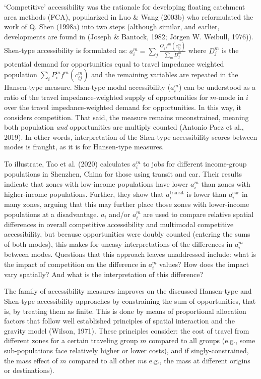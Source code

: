 \documentclass[
11pt, %
oneside, %
english, %
singlespacing, %
]{macthesis} %
\begin{document}
`Competitive' accessibility was the rationale for developing floating catchment area methods (FCA), popularized in Luo \& Wang (2003b) who reformulated the work of Q. Shen (1998a) into two steps (although similar, and earlier, developments are found in (Joseph \& Bantock, 1982; Jörgen W. Weibull, 1976)). Shen-type accessibility is formulated as: \(a_i^m = \sum_j \frac{O_jf^m(c_{ij}^m)}{\sum_m D_j^m}\) where \(D_j^m\) is the potential demand for opportunities equal to travel impedance weighted population \(\sum_i P_i^m f^m(c_{ij}^m)\) and the remaining variables are repeated in the Hansen-type measure. Shen-type modal accessibility (\(a_i^m\)) can be understood as a ratio of the travel impedance-weighted supply of opportunities for \(m\)-mode in \(i\) over the travel impedance-weighted demand for opportunities. In this way, it considers competition. That said, the measure remains unconstrained, meaning both population \emph{and} opportunities are multiply counted (Antonio Paez et al., 2019). In other words, interpretation of the Shen-type accessibility scores between modes is fraught, as it is for Hansen-type measures.

To illustrate, Tao et al. (2020) calculates \(a_i^m\) to jobs for different income-group populations in Shenzhen, China for those using transit and car. Their results indicate that zones with low-income populations have lower \(a_i^m\) than zones with higher-income populations. Further, they show that \(a_i^{\text{transit}}\) is lower than \(a_i^{\text{car}}\) in many zones, arguing that this may further place those zones with lower-income populations at a disadvantage. \(a_i\) and/or \(a_i^m\) are used to compare relative spatial differences in overall competitive accessibility and multimodal competitive accessibility, but because opportunities were doubly counted (entering the sums of both modes), this makes for uneasy interpretations of the differences in \(a_i^{m}\) between modes. Questions that this approach leaves unaddressed include: what is the impact of competition on the difference in \(a_i^m\) values? How does the impact vary spatially? And what is the interpretation of this difference?

The family of accessibility measures improves on the discussed Hansen-type and Shen-type accessibility approaches by constraining the sum of opportunities, that is, by treating them as finite. This is done by means of proportional allocation factors that follow well established principles of spatial interaction and the gravity model (Wilson, 1971). These principles consider: the cost of travel from different zones for a certain traveling group \(m\) compared to all groups (e.g., some sub-populations face relatively higher or lower costs), and if singly-constrained, the mass effect of \(m\) compared to all other \(m\)s e.g., the mass at different origins or destinations).
\end{document}

